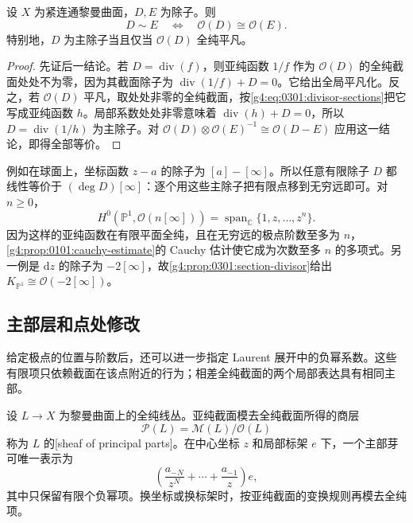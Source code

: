 \begin{proposition}\label{g4:prop:0301:principal-trivial}
	设 \(X\) 为紧连通黎曼曲面，\(D,E\) 为除子。则
	\[
		D\sim E\quad\Longleftrightarrow\quad
		\mathcal O(D)\cong\mathcal O(E).
	\]
	特别地，\(D\) 为主除子当且仅当 \(\mathcal O(D)\) 全纯平凡。
\end{proposition}
\begin{proof}
	先证后一结论。若 \(D=\operatorname{div}(f)\)，则亚纯函数 \(1/f\) 作为 \(\mathcal O(D)\) 的全纯截面处处不为零，因为其截面除子为 \(\operatorname{div}(1/f)+D=0\)。它给出全局平凡化。反之，若 \(\mathcal O(D)\) 平凡，取处处非零的全纯截面，按\eqref{g4:eq:0301:divisor-sections}把它写成亚纯函数 \(h\)。局部系数处处非零意味着 \(\operatorname{div}(h)+D=0\)，所以 \(D=\operatorname{div}(1/h)\) 为主除子。对 \(\mathcal O(D)\otimes\mathcal O(E)^{-1}\cong\mathcal O(D-E)\) 应用这一结论，即得全部等价。
\end{proof}

例如在球面上，坐标函数 \(z-a\) 的除子为 \([a]-[\infty]\)。所以任意有限除子 \(D\) 都线性等价于 \((\deg D)[\infty]\)：逐个用这些主除子把有限点移到无穷远即可。对 \(n\ge0\)，
\[
	H^0(\mathbb P^1,\mathcal O(n[\infty]))
	=\operatorname{span}_{\mathbb C}\{1,z,\ldots,z^n\}.
\]
因为这样的亚纯函数在有限平面全纯，且在无穷远的极点阶数至多为 \(n\)，\cref{g4:prop:0101:cauchy-estimate}的 Cauchy 估计使它成为次数至多 \(n\) 的多项式。另一例是 \(\mathrm{d}z\) 的除子为 \(-2[\infty]\)，故\cref{g4:prop:0301:section-divisor}给出 \(K_{\mathbb P^1}\cong\mathcal O(-2[\infty])\)。

\subsection{主部层和点处修改}
\label{g4:subsec:0301:03}

给定极点的位置与阶数后，还可以进一步指定 Laurent 展开中的负幂系数。这些有限项只依赖截面在该点附近的行为；相差全纯截面的两个局部表达具有相同主部。

\begin{definition}\label{g4:def:0301:principal-parts}
	设 \(L\to X\) 为黎曼曲面上的全纯线丛。亚纯截面模去全纯截面所得的商层
	\[
		\mathcal P(L)=\mathcal M(L)/\mathcal O(L)
	\]
	称为 \(L\) 的[sheaf of principal parts]。在中心坐标 \(z\) 和局部标架 \(e\) 下，一个主部芽可唯一表示为
	\[
		\left(\frac{a_{-N}}{z^N}+\cdots+\frac{a_{-1}}z\right)e,
	\]
	其中只保留有限个负幂项。换坐标或换标架时，按亚纯截面的变换规则再模去全纯项。
\end{definition}

